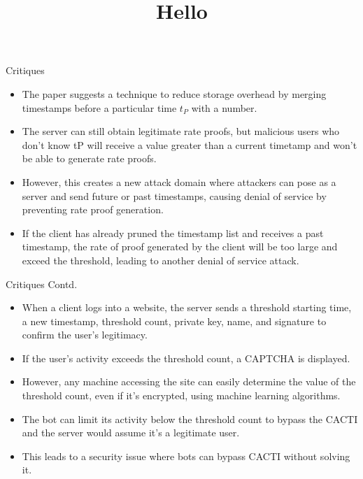 \documentclass{beamer}
\begin{document}
\begin{frame}{Critiques}
	\title{Hello}
	\begin{itemize}
		\item The paper suggests a technique to reduce storage overhead by merging timestamps before a particular time $t_P$ with a number.
		\item The server can still obtain legitimate rate proofs, but malicious users who don't know tP will receive a value greater than a current timetamp and won't be able to generate rate proofs.
		\item However, this creates a new attack domain where attackers can pose as a server and send future or past timestamps, causing denial of service by preventing rate proof generation.
		\item If the client has already pruned the timestamp list and receives a past timestamp, the rate of proof generated by the client will be too large and exceed the threshold, leading to another denial of service attack.
	\end{itemize}
\end{frame}

\begin{frame}{Critiques Contd.}
	\begin{itemize}
		\item When a client logs into a website, the server sends a threshold starting time, a new timestamp, threshold count, private key, name, and signature to confirm the user's legitimacy.
		\item If the user's activity exceeds the threshold count, a CAPTCHA is displayed.
		\item However, any machine accessing the site can easily determine the value of the threshold count, even if it's encrypted, using machine learning algorithms.
		\item The bot can limit its activity below the threshold count to bypass the CACTI and the server would assume it's a legitimate user.
		\item This leads to a security issue where bots can bypass CACTI without solving it.
	\end{itemize}
\end{frame}
\end{document}
